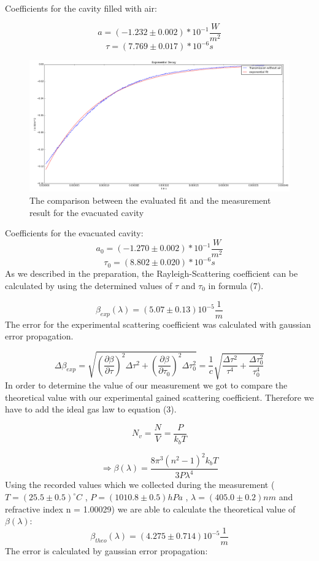 \documentclass[10pt,a4paper]{article}
\begin{document}
Coefficients for the cavity filled with air:

$$ a = (-1.232 \pm 0.002 ) * 10^{-1}\frac{W}{m^{2}} $$
$$ \tau = (7.769 \pm 0.017) * 10^{-6} s $$

\begin{figure}[h]
	\includegraphics[scale = 0.7]{expvac.png}
	\centering
	\caption{The comparison between the evaluated fit and the measurement result for the evacuated cavity}
	\label{exponential vac}
\end{figure}
Coefficients for the evacuated cavity:
$$ a_{0} = (-1.270 \pm 0.002 ) * 10^{-1}\frac{W}{m^{2}} $$
$$ \tau_{0} = (8.802 \pm 0.020) * 10^{-6} s $$
As we described in the preparation, the Rayleigh-Scattering coefficient can be calculated by using the determined values of $\tau$ and $\tau_{0}$ in formula (7). 

$$ \beta_{exp}(\lambda) = (5.07 \pm 0.13) 10^{-5}\frac{1}{m} $$
The error for the experimental scattering coefficient was calculated with gaussian error propagation.

\begin{equation}
\Delta \beta_{exp} = \sqrt{(\frac{\partial \beta}{\partial \tau})^{2}\Delta \tau^{2} + (\frac{\partial \beta}{\partial \tau_{0}})^{2}\Delta \tau_{0}^{2}} = \frac{1}{c} \sqrt{\frac{\Delta \tau^{2}}{\tau^{4}} + \frac{\Delta \tau_{0}^{2}}{\tau_{0}^{4}} }
\end{equation}
In order to determine the value of our measurement we got to compare the theoretical value with our experimental gained scattering coefficient. Therefore we have to add the ideal gas law to equation (3).

$$ N_{v} = \frac{N}{V} = \frac{P}{k_{b}T} $$

\begin{equation}
 \Rightarrow \beta(\lambda) = \frac{8\pi^{3}(n^{2}-1)^{2}k_{b}T}{3P \lambda^{4}} 
\end{equation}
Using the recorded values which we collected during the measurement ($T = (25.5 \pm 0.5) ^\circ C$ , $ P = (1010.8 \pm 0.5) hPa$ , $\lambda = (405.0 \pm 0.2) nm$ and refractive index n = 1.00029) we are able to calculate the theoretical value of $\beta (\lambda)$:
$$ \beta_{theo} (\lambda) = (4.275 \pm 0.714) 10^{-5} \frac{1}{m} $$
The error is calculated by gaussian error propagation:
\end{document}
